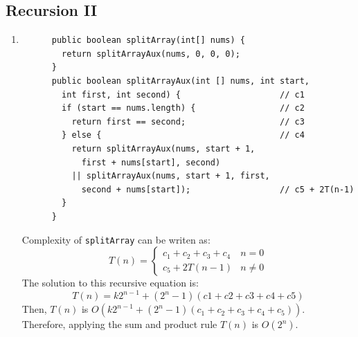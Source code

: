 \documentclass[a4paper,12pt]{article}
\begin{document}
    \subsection{Recursion II}
    \begin{enumerate}
      \item \begin{Verbatim}
      public boolean splitArray(int[] nums) {
        return splitArrayAux(nums, 0, 0, 0);
      }
      public boolean splitArrayAux(int [] nums, int start,
        int first, int second) {                    // c1
        if (start == nums.length) {                 // c2
          return first == second;                   // c3
        } else {                                    // c4
          return splitArrayAux(nums, start + 1,
            first + nums[start], second)
          || splitArrayAux(nums, start + 1, first,
            second + nums[start]);                  // c5 + 2T(n-1)
        }
      }
      \end{Verbatim}
      Complexity of \texttt{splitArray} can be writen as:
      \begin{equation*}
        T\left(n\right)=\left\{\begin{array}{cc}c_1+c_2+c_3+c_4&n=0\\c_5+2T\left(n-1\right)&n\neq0\end{array}\right.
      \end{equation*}
      The solution to this recursive equation is:
      \begin{equation*}
        T\left( n \right)=k2^{n-1} + \left( 2^{n} - 1 \right) \left( c1 + c2 + c3 + c4 + c5 \right)
      \end{equation*}
      Then, $T\left(n\right)$ is $O\left(k2^{n-1} + \left( 2^{n} - 1 \right) \left( c_1 + c_2 + c_3 + c_4 + c_5 \right)\right)$.\\
      Therefore, applying the sum and product rule $T(n)$ is $O(2^n)$.


\end{enumerate}
\end{document}
